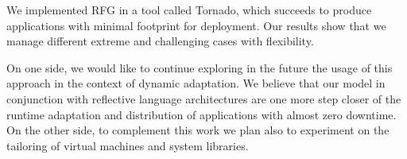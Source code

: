 We implemented RFG in a tool called Tornado, which succeeds to produce applications with minimal footprint for deployment. Our results show that we manage different extreme and challenging cases with flexibility.

On one side, we would like to continue exploring in the future the usage of this approach in the context of dynamic adaptation. We believe that our model in conjunction with reflective language architectures are one more step closer of the runtime adaptation and distribution of applications with almost zero downtime. On the other side, to complement this work we plan also to experiment on the tailoring of virtual machines and system libraries.

